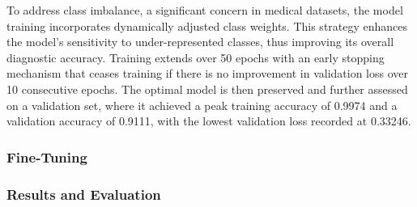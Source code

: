 To address class imbalance, a significant concern in medical datasets, the model training incorporates dynamically adjusted class weights. This strategy enhances the model's sensitivity to under-represented classes, thus improving its overall diagnostic accuracy. 
Training extends over 50 epochs with an early stopping mechanism that ceases training if there is no improvement in validation loss over 10 consecutive epochs. The optimal model is then preserved and further assessed on a validation set, where it achieved a peak training accuracy of 0.9974 and a validation accuracy of 0.9111, with the lowest validation loss recorded at 0.33246.


\subsubsection{Fine-Tuning}





\subsubsection{Results and Evaluation}

